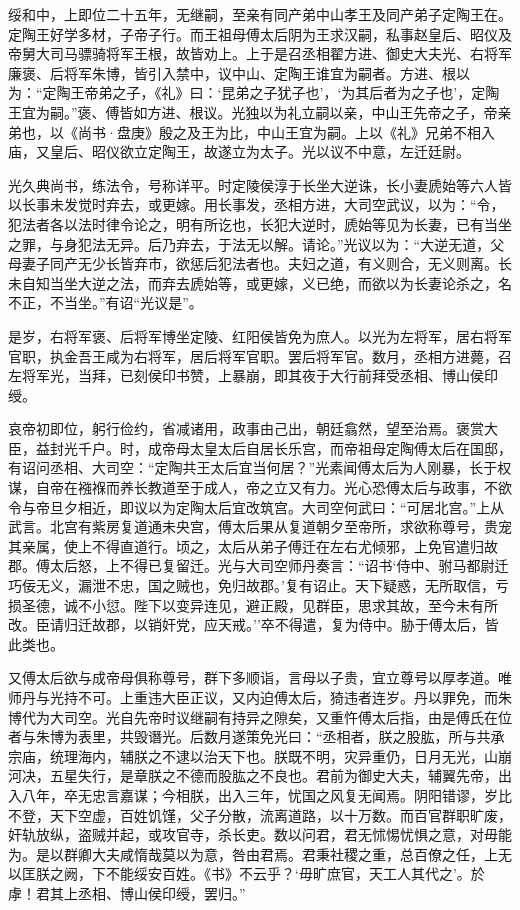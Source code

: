 \documentclass[]{article}
\begin{document}
绥和中，上即位二十五年，无继嗣，至亲有同产弟中山孝王及同产弟子定陶王在。定陶王好学多材，子帝子行。而王祖母傅太后阴为王求汉嗣，私事赵皇后、昭仪及帝舅大司马骠骑将军王根，故皆劝上。上于是召丞相翟方进、御史大夫光、右将军廉褒、后将军朱博，皆引入禁中，议中山、定陶王谁宜为嗣者。方进、根以为：``定陶王帝弟之子，《礼》曰：`昆弟之子犹子也'，`为其后者为之子也'，定陶王宜为嗣。''褒、傅皆如方进、根议。光独以为礼立嗣以亲，中山王先帝之子，帝亲弟也，以《尚书·盘庚》殷之及王为比，中山王宜为嗣。上以《礼》兄弟不相入庙，又皇后、昭仪欲立定陶王，故遂立为太子。光以议不中意，左迁廷尉。

光久典尚书，练法令，号称详平。时定陵侯淳于长坐大逆诛，长小妻虒始等六人皆以长事未发觉时弃去，或更嫁。用长事发，丞相方进，大司空武议，以为：``令，犯法者各以法时律令论之，明有所讫也，长犯大逆时，虒始等见为长妻，已有当坐之罪，与身犯法无异。后乃弃去，于法无以解。请论。''光议以为：``大逆无道，父母妻子同产无少长皆弃市，欲惩后犯法者也。夫妇之道，有义则合，无义则离。长未自知当坐大逆之法，而弃去虒始等，或更嫁，义已绝，而欲以为长妻论杀之，名不正，不当坐。''有诏``光议是''。

是岁，右将军褒、后将军博坐定陵、红阳侯皆免为庶人。以光为左将军，居右将军官职，执金吾王咸为右将军，居后将军官职。罢后将军官。数月，丞相方进薨，召左将军光，当拜，已刻侯印书赞，上暴崩，即其夜于大行前拜受丞相、博山侯印绶。

哀帝初即位，躬行俭约，省减诸用，政事由己出，朝廷翕然，望至治焉。褒赏大臣，益封光千户。时，成帝母太皇太后自居长乐宫，而帝祖母定陶傅太后在国邸，有诏问丞相、大司空：``定陶共王太后宜当何居？''光素闻傅太后为人刚暴，长于权谋，自帝在襁褓而养长教道至于成人，帝之立又有力。光心恐傅太后与政事，不欲令与帝旦夕相近，即议以为定陶太后宜改筑宫。大司空何武曰：``可居北宫。''上从武言。北宫有紫房复道通未央宫，傅太后果从复道朝夕至帝所，求欲称尊号，贵宠其亲属，使上不得直道行。顷之，太后从弟子傅迁在左右尤倾邪，上免官遣归故郡。傅太后怒，上不得已复留迁。光与大司空师丹奏言：``诏书`侍中、驸马都尉迁巧佞无义，漏泄不忠，国之贼也，免归故郡。'复有诏止。天下疑惑，无所取信，亏损圣德，诚不小愆。陛下以变异连见，避正殿，见群臣，思求其故，至今未有所改。臣请归迁故郡，以销奸党，应天戒。''卒不得遣，复为侍中。胁于傅太后，皆此类也。

又傅太后欲与成帝母俱称尊号，群下多顺诣，言母以子贵，宜立尊号以厚孝道。唯师丹与光持不可。上重违大臣正议，又内迫傅太后，猗违者连岁。丹以罪免，而朱博代为大司空。光自先帝时议继嗣有持异之隙矣，又重忤傅太后指，由是傅氏在位者与朱博为表里，共毁谮光。后数月遂策免光曰：``丞相者，朕之股肱，所与共承宗庙，统理海内，辅朕之不逮以治天下也。朕既不明，灾异重仍，日月无光，山崩河决，五星失行，是章朕之不德而股肱之不良也。君前为御史大夫，辅翼先帝，出入八年，卒无忠言嘉谋；今相朕，出入三年，忧国之风复无闻焉。阴阳错谬，岁比不登，天下空虚，百姓饥馑，父子分散，流离道路，以十万数。而百官群职旷废，奸轨放纵，盗贼并起，或攻官寺，杀长吏。数以问君，君无怵惕忧惧之意，对毋能为。是以群卿大夫咸惰哉莫以为意，咎由君焉。君秉社稷之重，总百僚之任，上无以匡朕之阙，下不能绥安百姓。《书》不云乎？`毋旷庶官，天工人其代之'。於虖！君其上丞相、博山侯印绶，罢归。''
\end{document}
